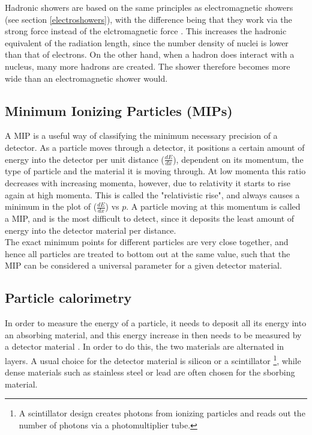 \documentclass[12 pt]{article}
\begin{document}
			Hadronic showers are based on the same principles as electromagnetic showers (see section \ref{electroshowers}), with the difference being that they work via the strong force instead of the elctromagnetic force \cite{}. This increases the hadronic equivalent of the radiation length, since the number density of nuclei is lower than that of electrons. On the other hand, when a hadron does interact with a nucleus, many more hadrons are created. The shower therefore becomes more wide than an electromagnetic shower would. 



		\subsection{Minimum Ionizing Particles (MIPs)}
			A MIP is a useful way of classifying the minimum necessary precision of a detector. As a particle moves through a detector, it positions a certain amount of energy into the detector per unit distance ($\frac{dE}{dx}$), dependent on its momentum, the type of particle and the material it is moving through. At low momenta this ratio decreases with increasing momenta, however, due to relativity it starts to rise again at high momenta. This is called the "relativistic rise", and always causes a minimum in the plot of ($\frac{dE}{dx}$) vs $p$. A particle moving at this momentum is called a MIP, and is the most difficult to detect, since it deposits the least amount of energy into the detector material per distance. \\

			The exact minimum points for different particles are very close together, and hence all particles are treated to bottom out at the same value, such that the MIP can be considered a universal parameter for a given detector material. 

		\subsection{Particle calorimetry}
			In order to measure the energy of a particle, it needs to deposit all its energy into an absorbing material, and this energy increase in then needs to be measured by a detector material \cite{}. In order to do this, the two materials are alternated in layers. A usual choice for the detector material is silicon or a scintillator \footnote{A scintillator design creates photons from ionizing particles and reads out the number of photons via a photomultiplier tube.}, while dense materials such as stainless steel or lead are often chosen for the sborbing material.
\end{document}
